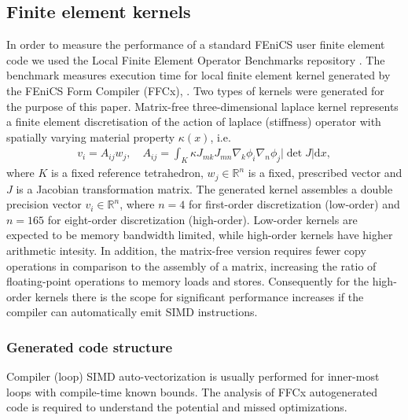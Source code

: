 \subsection*{Finite element kernels}

In order to measure the performance of a standard FEniCS user finite element
code we used the Local Finite Element Operator Benchmarks repository
\cite{Baratta2023}. The benchmark measures execution time for local finite
element kernel generated by the FEniCS Form Compiler (FFCx), \cite{Habera2020}.
Two types of kernels were generated for the purpose of this paper. Matrix-free
three-dimensional laplace kernel represents a finite element discretisation of
the action of laplace (stiffness) operator with spatially varying material
property $\kappa(x)$, i.e.
\begin{align}
    v_i = A_{ij} w_j, \quad
    A_{ij} = \int_K \kappa J_{mk} J_{mn} \nabla_k \phi_i \nabla_n \phi_j |\det J| \mathrm dx,
\end{align}
where $K$ is a fixed reference tetrahedron, $w_j \in \mathbb{R}^{n}$ is a fixed,
prescribed vector and $J$ is a Jacobian transformation matrix. The generated
kernel assembles a double precision vector $v_i \in \mathbb{R}^{n}$, where $n =
4$ for first-order discretization (low-order) and $n = 165$ for eight-order
discretization (high-order). Low-order kernels are expected to be memory
bandwidth limited, while high-order kernels have higher arithmetic intesity. In
addition, the matrix-free version requires fewer copy operations in comparison
to the assembly of a matrix, increasing the ratio of floating-point operations
to memory loads and stores. Consequently for the high-order kernels there is
the scope for significant performance increases if the compiler can
automatically emit SIMD instructions.

\subsubsection*{Generated code structure}

Compiler (loop) SIMD auto-vectorization is usually performed for inner-most loops
with compile-time known bounds. The analysis of FFCx autogenerated code is
required to understand the potential and missed optimizations.

